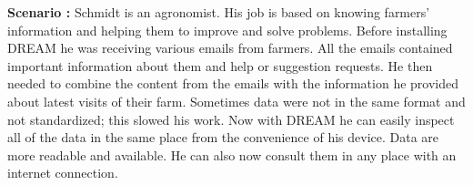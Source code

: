 \begin{flushleft}
\textbf{Scenario :} 
Schmidt is an agronomist. His job is based on knowing farmers' information and helping them to improve and solve problems. Before installing DREAM he was receiving various emails from farmers. All the emails contained important information about them and help or suggestion requests. He then needed to combine the content from the emails with the information he provided about latest visits of their farm. Sometimes data were not in the same format and not standardized; this slowed his work. Now with DREAM he can easily inspect all of the data in the same place from the convenience of his device. Data are more readable and available. He can also now consult them in any place with an internet connection.
\end{flushleft}